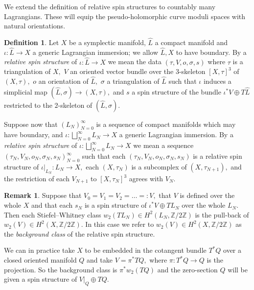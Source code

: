 \documentclass{article}
\theoremstyle{plain}%
\theoremstyle{definition}
\newtheorem{dfn}[thm]{Definition}
\newtheorem{rem}[thm]{Remark}
\numberwithin{equation}{section}
\numberwithin{figure}{section}
\def\Z{{\mathbin{\mathbb Z}}}
\def\io{\iota}
\def\si{\sigma}
\def\ta{\tau}
\def\op{\oplus}
\def\iy{\infty}
\begin{document}
We extend the definition of relative spin structures to countably many Lagrangians. These will equip the pseudo-holomorphic curve moduli spaces with natural orientations.
\begin{dfn}
Let $X$ be a symplectic manifold, $\hat L$ a compact manifold and $\io:\hat L\to X$ a generic Lagrangian immersion; we allow $\hat L,X$ to have boundary. By a {\it relative spin structure} of $\io:\hat L\to X$ we mean the data $(\tau,V,o,\si,s)$ where $\ta$ is a triangulation of $X,$ $V$ an oriented vector bundle over the $3$-skeleton $[X,\tau]^3$ of $(X,\tau),$ $o$ an orientation of $\hat L,$
$\si$ a triangulation of $\hat L$ such that $\io$ induces a simplicial map $(\hat L,\si)\to(X,\ta),$ and $s$ a spin structure of the bundle $\io^*V\op T\hat L$ restricted to the $2$-skeleton of $(\hat L,\si).$

Suppose now that $(L_N)_{N=0}^\iy$ is a sequence of compact manifolds which may have boundary, and $\io:\bigsqcup_{N=0}^\iy L_N\to X$ a generic Lagrangian immersion. By a {\it relative spin structure} of $\io: \bigsqcup_{N=0}^\iy L_N\to X$ we mean a sequence $(\ta_N,V_N,o_N,\si_N,s_N)_{N=0}^\iy$ such that each $(\ta_N,V_N,o_N,\si_N,s_N)$ is a relative spin structure of $\io|_{L_N}:L_N\to X,$ each $(X,\ta_N)$ is a subcomplex of $(X,\ta_{N+1}),$ and the restriction of each $V_{N+1}$ to $[X,\ta_N]^3$ agrees with $V_N.$
\end{dfn}
\begin{rem}
Suppose that $V_0=V_1=V_2=\dots=:V,$ that $V$ is defined over the whole $X$ and that each $s_N$ is a spin structure of $\io^*V\op TL_N$ over the whole $L_N.$
Then each Stiefel--Whitney class $w_2(TL_N)\in H^2(L_N,\Z/2\Z)$ is the pull-back of $w_2(V)\in H^2(X,\Z/2\Z).$ 
In this case we refer to $w_2(V)\in H^2(X,\Z/2\Z)$ as the {\it background class} of the relative spin structure.

We can in practice take $X$ to be embedded in the cotangent bundle $T^*Q$ over a closed oriented manifold $Q$ and take $V=\pi^*TQ,$ where $\pi:T^*Q\to Q$ is the projection. So the background class is $\pi^*w_2(TQ)$ and the zero-section $Q$ will be given a spin structure of $V|_Q\oplus TQ.$
\end{rem}
\end{document}
